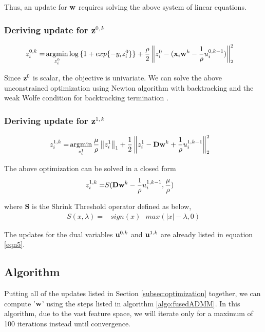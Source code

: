 \documentclass[conference,10pt,draftclsnofoot,onecolumn]{IEEEtran}
\begin{document}
Thus, an update for $\mathbf{w}$ requires solving the above system of linear equations.

\subsubsection{Deriving update for \textbf{z}$^{0, k}$}
\label{subsubsec:z0update}

\begin{align}
\label{eqn7}
z_i^{0,k} = & \argmin_{z_i^0}   \log{\{1+exp\{-y_{i}z_{i}^{0}\}\}} + \frac{\rho}{2}\nrmt{z_{i}^{0} - (\xx_{i}\ww^{k}-\frac{1}{\rho}u_{i}^{0,k-1})}^{2} 
\end{align}

Since $\mathbf{z}^{0}$ is scalar, the objective is univariate. We can solve the above unconstrained optimization using Newton algorithm
with backtracking and the weak Wolfe condition for backtracking termination \cite{burke12}.

\subsubsection{Deriving update for \textbf{z}$^{1, k}$}
\label{subsubsec:z1update}

\begin{align}
\label{eqn8}
z_i^{1,k} = & \argmin_{z_i^1} \frac{\mu}{\rho} \nrmo{z_{i}^{1}} + \frac{1}{2} \nrmt{z_{i}^{1} - \DD\ww^{k} + \frac{1}{\rho}u_{i}^{1,k-1}}^{2} 
\end{align}

The above optimization can be solved in a closed form 
\begin{align}
\label{eqn9}
z_i^{1,k} = & S(\DD\ww^{k} - \frac{1}{\rho}u_{i}^{1, k-1}, \frac{\mu}{\rho}) 
\end{align}

where \textbf{S} is the Shrink Threshold operator defined as below,
\begin{align}
\label{eqn10}
S(x, \lambda) = & sign(x) \textrm{  } max (|x| - \lambda, 0)
\end{align}

The updates for the dual variables $\mathbf{u}^{0,k}$ and $\mathbf{u}^{1,k}$ are already listed in equation \eqref{eqn5}.

\subsection{Algorithm}
Putting all of the updates listed in Section \ref{subsec:optimization} together, we can compute '$\mathbf{w}$' using the steps listed in algorithm \ref{algo:fusedADMM}. In this
algorithm, due to the vast feature space, we will iterate only for a maximum of 100 iterations instead until convergence.
\end{document}
